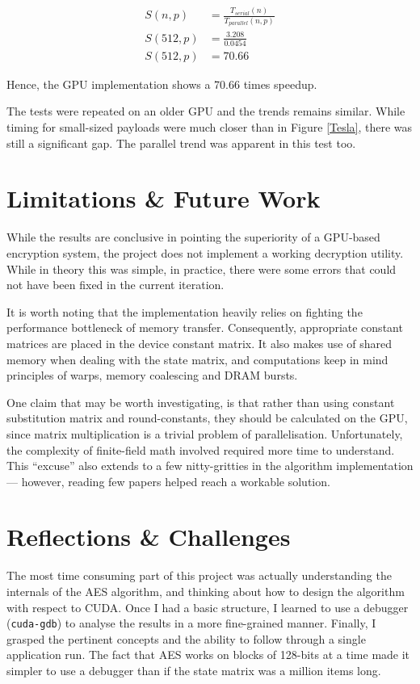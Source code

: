 \documentclass[letterpaper,twocolumn,10pt]{article}
\begin{document}
\begin{align}
    S(n,p) &= \frac{
            T_{serial}(n)
            }{
            T_{parallel}(n,p)
            }
    \\
    S(512, p) &= \frac{
            3.208
            }{
            0.0454
            }
    \\
    S(512, p) &= 70.66
\end{align}

Hence, the GPU implementation shows a 70.66 times speedup.

The tests were repeated on an older GPU and the trends remains similar. While timing for small-sized payloads were much closer than in Figure \ref{Tesla}, there was still a significant gap. The parallel trend was apparent in this test too.

\section{Limitations \& Future Work}
While the results are conclusive in pointing the superiority of a GPU-based encryption system, the project does not implement a working decryption utility. While in theory this was simple, in practice, there were some errors that could not have been fixed in the current iteration.

It is worth noting that the implementation heavily relies on fighting the performance bottleneck of memory transfer. Consequently, appropriate constant matrices are placed in the device constant matrix. It also makes use of shared memory when dealing with the state matrix, and computations keep in mind principles of warps, memory coalescing and DRAM bursts.

One claim that may be worth investigating, is that rather than using constant substitution matrix and round-constants, they should be calculated on the GPU, since matrix multiplication is a trivial problem of parallelisation.
Unfortunately, the complexity of finite-field math involved required more time to understand. This ``excuse'' also extends to a few nitty-gritties in the algorithm implementation --- however, reading few papers helped reach a workable solution.

\section{Reflections \& Challenges}
The most time consuming part of this project was actually understanding the internals of the AES algorithm, and thinking about how to design the algorithm with respect to CUDA.
Once I had a basic structure, I learned to use a debugger (\texttt{cuda-gdb}) to analyse the results in a more fine-grained manner.
Finally, I grasped the pertinent concepts and the ability to follow through a single application run.
The fact that AES works on blocks of 128-bits at a time made it simpler to use a debugger than if the state matrix was a million items long.
\end{document}
